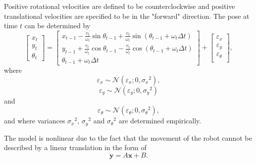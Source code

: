 \documentclass[12pt,oneside,openany,a4paper, %
afrikaans,english,
]{memoir}
\numberwithin{equation}{chapter}
\begin{document}
Positive rotational velocities are defined to be counterclockwise and positive translational velocities are specified to be in the "forward" direction.
The pose at time $t$ can be determined by
\begin{equation}
\begin{bmatrix}
x_t\\
y_t\\
\theta_t
\end{bmatrix}
=
\begin{bmatrix}
x_{t-1} - \frac{v_t}{\omega_t} \sin\theta_{t-1} + \frac{v_t}{\omega_t} \sin(\theta_{t-1} + \omega_t \Delta t)\\
y_{t-1} + \frac{v_t}{\omega_t} \cos\theta_{t-1} - \frac{v_t}{\omega_t} \cos(\theta_{t-1} + \omega_t \Delta t)\\
\theta_{t-1} + \omega_t \Delta t
\end{bmatrix}+
\begin{bmatrix}
\varepsilon_x\\
\varepsilon_y\\
\varepsilon_\theta\\
\end{bmatrix},
\end{equation}
where
\begin{equation}
\varepsilon_x \sim \mathcal{N}(\varepsilon_x; 0, {\sigma_x}^2),
\end{equation}
\begin{equation}
\varepsilon_y \sim \mathcal{N}(\varepsilon_y; 0, {\sigma_y}^2)
\end{equation}
and
\begin{equation}
\varepsilon_\theta \sim \mathcal{N}(\varepsilon_\theta; 0, {\sigma_\theta}^2),
\end{equation}
and where variances ${\sigma_x}^2$, ${\sigma_y}^2$ and ${\sigma_\theta}^2$ are determined empirically.

The model is nonlinear due to the fact that the movement of the robot cannot be described by a linear translation in the form of
\begin{equation}
\bm{y} = A\bm{x} + B.
\end{equation}
\end{document}
